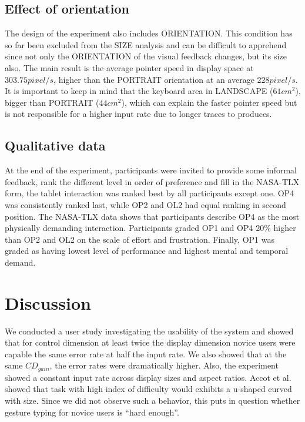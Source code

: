 \documentclass{chi-ext}
\newcommand{\cdt}[1]{{\small\uppercase{{#1}}}}
\begin{document}
\subsection{Effect of orientation}
The design of the experiment also includes \cdt{ORIENTATION}. This condition has so far been excluded from the SIZE analysis and can be difficult to apprehend since not only the \cdt{ORIENTATION} of the visual feedback changes, but its size also. The main result is the average pointer speed in display space at $303.75 pixel/s$, higher than the PORTRAIT orientation at an average $228 pixel/s$. It is important to keep in mind that the keyboard area in LANDSCAPE ($61 cm^2$), bigger than PORTRAIT ($44 cm^2$), which can explain the faster pointer speed but is not responsible for a higher input rate due to longer traces to produces.

\subsection{Qualitative data}
At the end of the experiment, participants were invited to provide some informal feedback, rank the different level in order of preference and fill in the NASA-TLX form, the tablet interaction was ranked best by all participants except one. \cdt{OP4} was consistently ranked last, while \cdt{OP2} and \cdt{OL2} had equal ranking in second position. The NASA-TLX data shows that participants describe \cdt{OP4} as the most physically demanding interaction. Participants graded \cdt{OP1} and \cdt{OP4} 20\% higher than \cdt{OP2} and \cdt{OL2} on the scale of effort and frustration. Finally, \cdt{OP1} was graded as having lowest level of performance and highest mental and temporal demand.

\section{Discussion}

We conducted a user study investigating the usability of the system and showed that for control dimension at least twice the display dimension novice users were capable the same error rate at half the input rate. We also showed that at the same $CD_{gain}$, the error rates were dramatically higher. Also, the experiment showed a constant input rate across display sizes and aspect ratios. Accot et al.~\cite{Accot2001} showed that task with high index of difficulty would exhibits a u-shaped curved with size. Since we did not observe such a behavior, this puts in question whether gesture typing for novice users is ``hard enough''.
\end{document}
